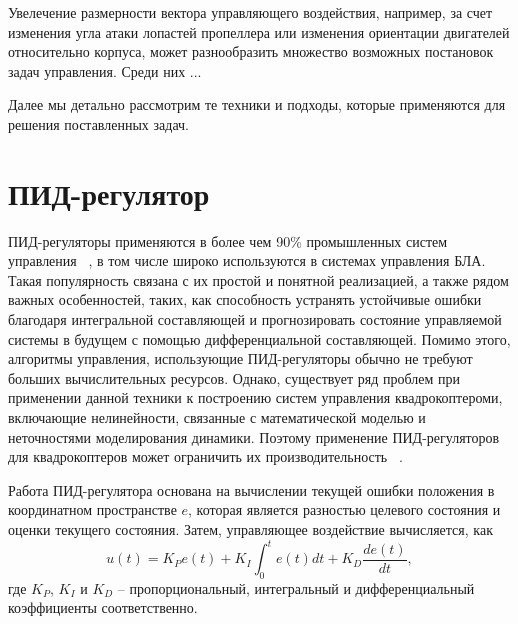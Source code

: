 \documentclass[a4paper,14pt,oneside,openany]{memoir}
\begin{document}
     Увелечение размерности вектора управляющего воздействия, например, за счет изменения угла атаки лопастей пропеллера или изменения ориентации двигателей относительно корпуса, может разнообразить множество возможных постановок задач управления. Среди них ...
     
	Далее мы детально рассмотрим те техники и подходы, которые применяются для решения поставленных задач. 
	
	\section{ПИД-регулятор}
	
	 ПИД-регуляторы применяются в более чем 90\% промышленных систем управления ~\cite{Astrom01}, в том числе широко используются в системах управления БЛА.  Такая популярность связана с их простой и понятной реализацией, а также рядом важных особенностей, таких, как способность устранять устойчивые ошибки благодаря интегральной составляющей и прогнозировать состояние управляемой системы в будущем с помощью дифференциальной составляющей. Помимо этого, алгоритмы управления, использующие ПИД-регуляторы обычно не требуют больших вычислительных ресурсов. Однако, существует ряд проблем при применении данной техники к построению систем управления квадрокоптероми, включающие нелинейности, связанные с математической моделью и неточностями моделирования динамики. Поэтому применение ПИД-регуляторов для квадрокоптеров может ограничить их производительность ~\cite{Zulu01}.
	
	Работа ПИД-регулятора основана на вычислении текущей ошибки положения в координатном пространстве $e$, которая является разностью целевого состояния и оценки текущего состояния. Затем, управляющее воздействие вычисляется, как
	\begin{equation} \label{eq:pid_common}
	u(t) = K_Pe(t) + K_I\int_0^t e(t) dt + K_D \frac{de(t)}{dt},
	\end{equation}
	где $K_P$, $K_I$ и $K_D$ -- пропорциональный, интегральный и дифференциальный коэффициенты соответственно.
	
\end{document}
